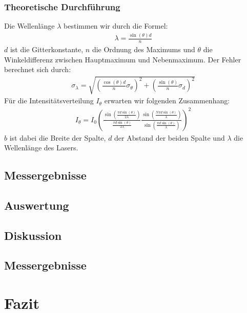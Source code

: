 \documentclass[12pt]{scrartcl}
\begin{document}
\subsubsection{Theoretische Durchführung}
Die Wellenlänge $\lambda$ bestimmen wir durch die Formel:
\begin{align}
\lambda = \frac{\sin(\theta) d}{n}
\end{align}
$d$ ist die Gitterkonstante, $n$ die Ordnung des Maximums und $\theta$ die Winkeldifferenz zwischen Hauptmaximum und Nebenmaximum.
Der Fehler berechnet sich durch:
\begin{align}
\sigma_\lambda = \sqrt{
\left(\frac{\cos(\theta) d}{n}\sigma_\theta\right)^2+
\left(\frac{\sin(\theta)}{n}\sigma_d\right)^2}
\end{align}
Für die Intensitätsverteilung $I_\theta$ erwarten wir folgenden Zusammenhang:
\begin{align}
I_\theta = I_0\left(\frac{\sin\left(\frac{\pi d \sin(\theta)}{2\lambda}\right)}{\frac{\pi d \sin(\theta)}{2\lambda}}
\frac{\sin\left(\frac{N \pi d \sin(\theta)}{\lambda}\right)}{\sin\left(\frac{\pi d \sin(\theta)}{\lambda}\right)}\right)^2
\end{align}
$b$ ist dabei die Breite der Spalte, $d$ der Abstand der beiden Spalte und $\lambda$ die Wellenlänge des Lasers.

\subsection{Messergebnisse}
\subsection{Auswertung}
\subsection{Diskussion}
\subsection{Messergebnisse}



\section{Fazit}


\end{document}
